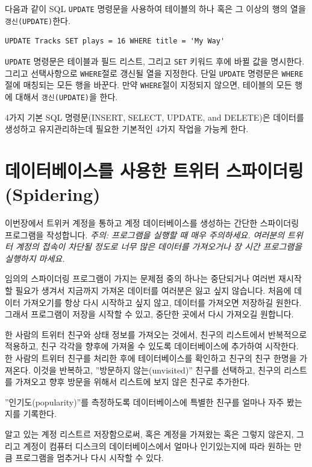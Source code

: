 다음과 같이 SQL {\tt UPDATE} 명령문을 사용하여 테이블의 하나 혹은 그 이상의 행의 열을 {\tt 갱신(UPDATE)}한다.

\beforeverb
\begin{verbatim}
UPDATE Tracks SET plays = 16 WHERE title = 'My Way'
\end{verbatim}
\afterverb
%

{\tt UPDATE} 명령문은 테이블과 필드 리스트, 그리고 {\tt SET} 키워드 후에 바뀔 값을 명시한다.
그리고 선택사항으로 {\tt WHERE}절로 갱신될 열을 지정한다. 
단일 {\tt UPDATE} 명령문은 {\tt WHERE}절에 매칭되는 모든 행을 바꾼다. 만약 {\tt WHERE}절이 지정되지 않으면,
테이블의 모든 행에 대해서 {\tt 갱신(UPDATE)}을 한다.

4가지 기본 SQL 명령문(INSERT, SELECT, UPDATE, and DELETE)은 데이터를 생성하고 유지관리하는데 필요한 기본적인 4가지 작업을 가능케 한다.

\section{데이터베이스를 사용한 트위터 스파이더링(Spidering)}

이번장에서 트위커 계정을 통하고 계정 데이터베이스를 생성하는 간단한 스파이더링 프로그램을 작성합니다.
\emph{주의: 프로그램을 실행할 때 매우 주의하세요. 여러분의 트위터 계정의 접속이 차단될 정도로 너무 많은 데이터를 가져오거나 
장 시간 프로그램을 실행하지 마세요.}

임의의 스파이더링 프로그램이 가지는 문제점 중의 하나는 중단되거나 여러번 재시작할 필요가 생겨서
지금까지 가져온 데이터를 여러분은 잃고 싶지 않습니다.
처음에 데이터 가져오기를 항상 다시 시작하고 싶지 않고,
데이터를 가져오면 저장하길 원한다.
그래서 프로그램이 저장을 시작할 수 있고, 중단한 곳에서 다시 가져오길 원합니다.

한 사람의 트위터 친구와 상태 정보를 가져오는 것에서, 친구의 리스트에서 반복적으로 적용하고, 친구 각각을 향후에 가져올 수 있도록 데이터베이스에 추가하여 시작한다. 
한 사람의 트위터 친구를 처리한 후에 테이터베이스를 확인하고 친구의 친구 한명을 가져온다. 이것을 반복하고, ''방문하지 않는(unvisited)'' 친구를 선택하고,
친구의 리스트를 가져오고 향후 방문을 위해서 리스트에 보지 않은 친구로 추가한다.

''인기도(popularity)''를 측정하도록 데이터베이스에 특별한 친구를 얼마나 자주 봤는지를 기록한다.

알고 있는 계정 리스트르 저장함으로써, 혹은 계정을 가져왔는 혹은 그렇지 않은지, 그리고 계정이 컴퓨터 디스크의 데이터베이스에서 얼마나 인기있는지에 따라
원하는 만큼 프로그램을 멈추거나 다시 시작할 수 있다.

